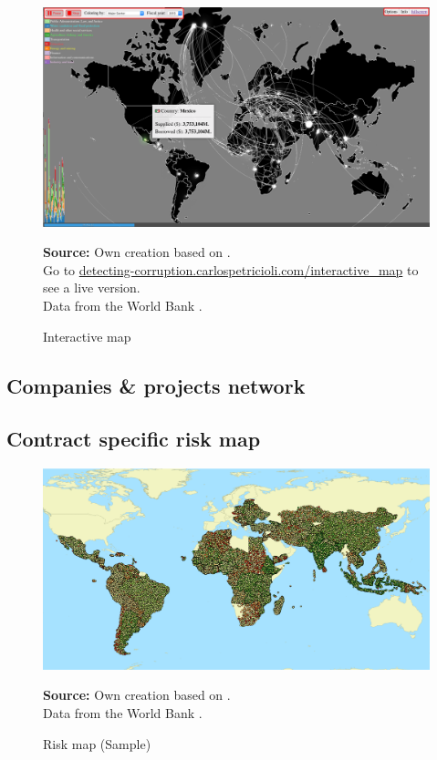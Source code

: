 \begin{figure}[H]
\begin{center}
\caption{Interactive map}
\label{fig_interactive_map}
\includegraphics[width=\textwidth,height=1\textheight,keepaspectratio]{../img/interactive_map_mex.pdf}
\end{center}
\noindent \footnotesize{\textbf{Source:} Own creation based on \cite{wb_i_map}. \\Go to \href{http://detecting-corruption.carlospetricioli.com/interactive_map}{detecting-corruption.carlospetricioli.com/interactive\_map} to see a live version. \\Data from the World Bank \parencite{wb_data}.}
\end{figure}

\subsection{Companies \& projects network}

\subsection{Contract specific risk map}

\begin{figure}[H]
\begin{center}
\caption{Risk map (Sample)}
\label{fig_risk_map}
\includegraphics[width=\textwidth,height=1\textheight,keepaspectratio]{../img/risk_map.pdf}
\end{center}
\noindent \footnotesize{\textbf{Source:} Own creation based on \cite{wb_i_map}. \\Data from the World Bank \parencite{wb_data}.}
\end{figure}

